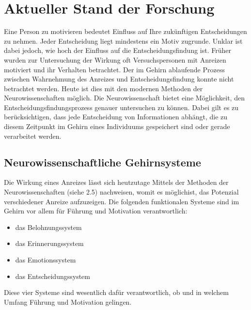 \section{Aktueller Stand der Forschung}
Eine Person zu motivieren bedeutet Einfluss auf Ihre zukünftigen Entscheidungen zu nehmen. Jeder Entscheidung liegt mindestens ein Motiv zugrunde. Unklar ist dabei jedoch, wie hoch der Einfluss auf die Entscheidungsfindung ist. Früher wurden zur Untersuchung der Wirkung oft Versuchspersonen mit Anreizen motiviert und ihr Verhalten betrachtet. Der im Gehirn ablaufende Prozess zwischen Wahrnehmung des Anreizes und Entscheidungsfindung konnte nicht betrachtet werden. Heute ist dies mit den modernen Methoden der Neurowissenschaften möglich. \citep[S. 59]{Nowka.2013}
Die Neurowissenschaft bietet eine Möglichkeit, den Entscheidungsfindungsprozess genauer untersuchen zu können. Dabei gilt es zu berücksichtigen, dass jede Entscheidung von Informationen abhängt, die zu diesem Zeitpunkt im Gehirn eines Individuums gespeichert sind oder gerade verarbeitet werden. \citep[S. 60]{Nowka.2013}

\subsection{Neurowissenschaftliche Gehirnsysteme}
Die Wirkung eines Anreizes lässt sich heutzutage Mittels der Methoden der Neurowissenschaften (siehe 2.5) nachweisen, womit es möglichist, das Potenzial verschiedener Anreize aufzuzeigen. Die folgenden funktionalen Systeme sind im Gehirn vor allem für Führung und Motivation verantwortlich: 

\begin{itemize}
\item das Belohnungssystem
\item das Erinnerungssystem
\item das Emotionssystem
\item das Entscheidungssystem
\end{itemize}

\glqq Diese vier Systeme sind wesentlich dafür verantwortlich, ob und in welchem Umfang Führung und Motivation gelingen.\grqq \citep[S. 16]{Seelbach.2011}

